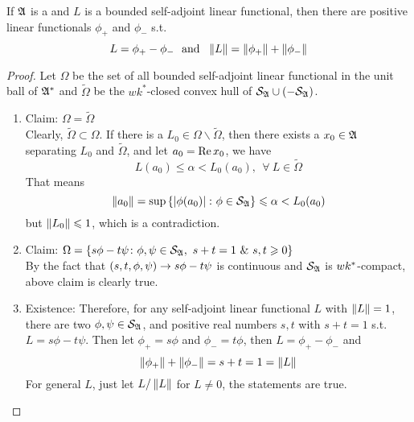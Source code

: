 \documentclass[a4paper,11pt]{report}
\begin{document}
\begin{thm} 
	If $\mathfrak{A}$ is a \Cs and $L$ is a bounded self-adjoint linear functional, then there are positive linear functionals $\phi_{+}$ and $\phi_{-}$ s.t. 
	\begin{equation*}
		L = \phi_{+} - \phi_{-} ~~\text{and}~~ \left\lVert L\right\lVert = \left\lVert\phi_{+}\right\lVert+\left\lVert\phi_{-}\right\lVert
	\end{equation*}
\end{thm}
\begin{proof}
	Let $\Omega$ be the set of all bounded self-adjoint linear functional in the unit ball of $\mathfrak{A}^{*}$ and $\tilde{\Omega}$ be the $wk^{*}$-closed convex hull of $\mathcal{S}_{\mathfrak{A}}\cup (-\mathcal{S}_{\mathfrak{A}})$.
	\begin{enumerate}[label=\arabic*)]
		\item Claim: $\Omega = \tilde{\Omega}$ \\
		Clearly, $\tilde{\Omega} \subset \Omega$. If there is a $L_0 \in \Omega \backslash \tilde{\Omega}$, then there exists a $x_0 \in \mathfrak{A}$ separating $L_0$ and $\tilde{\Omega}$, and let $a_0 = \operatorname{Re}{x_0}$, we have
		\begin{equation*}
			L(a_0) \leqslant \alpha < L_0(a_0),~~\forall~L \in \tilde{\Omega}
		\end{equation*}
		That means 
		\begin{equation*}
			\left\lVert a_0\right\lVert=\sup{\{\left\lvert\phi(a_0)\right\lvert \colon \phi \in \mathcal{S}_{\mathfrak{A}}\}} \leqslant \alpha < L_0(a_0)
		\end{equation*}
		but $\left\lVert L_0\right\lVert \leqslant 1$, which is a contradiction.
		\item Claim: $\Omega = \{ s\phi-t\psi \colon \phi,\psi \in \mathcal{S}_{\mathfrak{A}},~s+t = 1 ~\&~ s,t \geqslant 0\}$ \\
		By the fact that $(s,t,\phi,\psi) \rightarrow s\phi-t\psi$ is continuous and $\mathcal{S}_{\mathfrak{A}}$ is $wk^{*}$-compact, above claim is clearly true.
		\item Existence: Therefore, for any self-adjoint linear functional $L$ with $\left\lVert L\right\lVert = 1$, there are two $\phi,\psi \in \mathcal{S}_{\mathfrak{A}}$, and positive real numbers $s,t$ with $s+t=1$ s.t. $L=s\phi-t\psi$. Then let $\phi_{+} = s\phi$ and $\phi_{-}=t\phi$, then $L = \phi_{+} - \phi_{-}$ and
		\begin{equation*}
			\left\lVert\phi_{+}\right\lVert+\left\lVert\phi_{-}\right\lVert= s+t = 1 = \left\lVert L\right\lVert
		\end{equation*}
		For general $L$, just let $L / \left\lVert L\right\lVert$ for $L \neq 0$, the statements are true. \qedhere
	\end{enumerate}
\end{proof}
\end{document}
